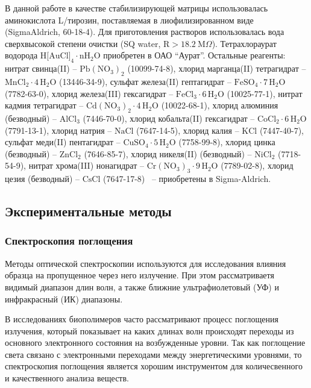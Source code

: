 \documentclass[a4paper, 12pt]{article}
\begin{document}
\begin{onehalfspace}
	В данной работе в качестве стабилизирующей матрицы использовалась аминокислота L\-/тирозин, поставляемая в лиофилизированном виде (SigmaAldrich, 60-18-4).
	Для приготовления растворов использовалась вода сверхвысокой степени очистки (SQ water, $\text{R}>18.2~\text{M}\Omega$).
	Тетрахлораурат водорода $\text{H[AuCl]}_4 \cdot \text{nH}_2\text{O}$ приобретен в ОАО \enquote{Аурат}.
	Остальные реагенты:
	нитрат свинца(II) – \(\mathrm{Pb\!\left(\mathrm{NO}_{3}\right)_{2}}\) (10099-74-8),
	хлорид марганца(II) тетрагидрат – \(\mathrm{MnCl_{2}\!\cdot\!4\,\mathrm{H_{2}O}}\) (13446-34-9),
	сульфат железа(II) гептагидрат – \(\mathrm{FeSO_{4}\!\cdot\!7\,\mathrm{H_{2}O}}\) (7782-63-0),
	хлорид железа(III) гексагидрат – \(\mathrm{FeCl_{3}\!\cdot\!6\,\mathrm{H_{2}O}}\) (10025-77-1),
	нитрат кадмия тетрагидрат – \(\mathrm{Cd\!\left(\mathrm{NO}_{3}\right)_{2}\!\cdot\!4\,\mathrm{H_{2}O}}\) (10022-68-1),
	хлорид алюминия (безводный) – \(\mathrm{AlCl_{3}}\) (7446-70-0),
	хлорид кобальта(II) гексагидрат – \(\mathrm{CoCl_{2}\!\cdot\!6\,\mathrm{H_{2}O}}\) (7791-13-1),
	хлорид натрия – \(\mathrm{NaCl}\) (7647-14-5),
	хлорид калия – \(\mathrm{KCl}\) (7447-40-7),
	сульфат меди(II) пентагидрат – \(\mathrm{CuSO_{4}\!\cdot\!5\,\mathrm{H_{2}O}}\) (7758-99-8),
	хлорид цинка (безводный) – \(\mathrm{ZnCl_{2}}\) (7646-85-7),
	хлорид никеля(II) (безводный) – \(\mathrm{NiCl_{2}}\) (7718-54-9),
	нитрат хрома(III) нонагидрат – \(\mathrm{Cr\!\left(\mathrm{NO}_{3}\right)_{3}\!\cdot\!9\,\mathrm{H_{2}O}}\) (7789-02-8),
	хлорид цезия (безводный) – \(\mathrm{CsCl}\) (7647-17-8)
	~– приобретены в Sigma-Aldrich.

	\subsection*{Экспериментальные методы}

		\subsubsection*{Спектроскопия поглощения}

		Методы оптической спектроскопии используются для исследования влияния образца на пропущенное через него излучение. При этом рассматриваетя видимый диапазон длин волн, а также ближние ультрафиолетовый (УФ) и инфракрасный (ИК) диапазоны.

		В исследованиях биополимеров часто рассматривают процесс поглощения излучения, который показывает на каких длинах волн происходят переходы из основного электронного состояния на возбужденные уровни. Так как поглощение света связано с электронными переходами между энергетическими уровнями, то спектроскопия поглощения является хорошим инструментом для количесвенного и качественного анализа веществ.


\end{onehalfspace}
\end{document}
